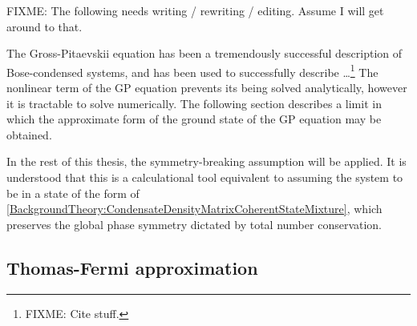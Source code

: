 \parasep

FIXME: The following needs writing / rewriting / editing.  Assume I will get around to that.

The Gross-Pitaevskii equation has been a tremendously successful description of Bose-condensed systems, and has been used to successfully describe \dots\footnote{FIXME: Cite stuff.}   The nonlinear term of the GP equation prevents its being solved analytically, however it is tractable to solve numerically.  The following section describes a limit in which the approximate form of the ground state of the GP equation may be obtained.

In the rest of this thesis, the symmetry-breaking assumption will be applied.  It is understood that this is a calculational tool equivalent to assuming the system to be in a state of the form of \eqref{BackgroundTheory:CondensateDensityMatrixCoherentStateMixture}, which preserves the global phase symmetry dictated by total number conservation.

\subsection{Thomas-Fermi approximation}

